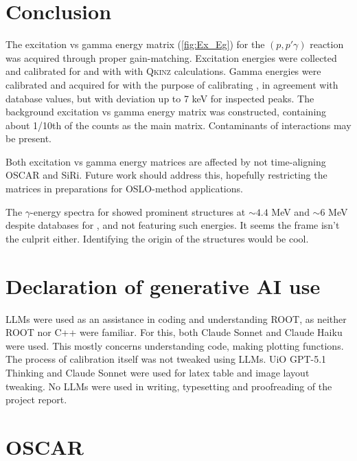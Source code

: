 \documentclass[a4paper,11pt]{article}
\begin{document}
\newpage
\section{Conclusion}
The excitation vs gamma energy matrix (\cref{fig:Ex_Eg}) for the $(p,p'\gamma)$ reaction was acquired through proper gain-matching. Excitation energies were collected and calibrated for and with  with \textsc{Qkinz} calculations. Gamma energies were calibrated and acquired for  with the purpose of calibrating , in agreement with database values, but with deviation up to 7 keV for inspected peaks.
The background excitation vs gamma energy matrix was constructed, containing about 1/10th of the counts as the main matrix. Contaminants of  interactions may be present.

Both excitation vs gamma energy matrices are affected by not time-aligning OSCAR and SiRi. Future work should address this, hopefully restricting the matrices in preparations for OSLO-method applications.  

The $\gamma$-energy spectra for  showed prominent structures at $\sim4.4$ MeV and $\sim6$ MeV despite databases for ,  and  not featuring such energies. It seems the  frame isn't the culprit either. Identifying the origin of the structures would be cool.

\section{Declaration of generative AI use}
LLMs were used as an assistance in coding and understanding ROOT, as neither ROOT nor C++ were familiar. For this, both Claude Sonnet and Claude Haiku were used. This mostly concerns understanding code, making plotting functions. The process of calibration itself was not tweaked using LLMs. UiO GPT-5.1 Thinking and Claude Sonnet were used for latex table and image layout tweaking. No LLMs were used in writing, typesetting and proofreading of the project report.

\newpage


\newpage
\appendix
\section{OSCAR}
\end{document}

